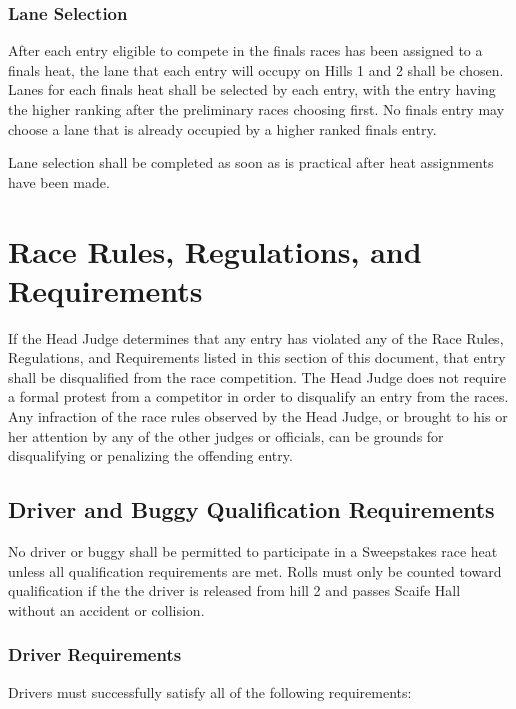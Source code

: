 \subsubsection{Lane Selection}

	After each entry eligible to compete in the finals races has been assigned to a finals heat, the lane that each entry will occupy on Hills 1 and 2 shall be chosen. Lanes for each finals heat shall be selected by each entry, with the entry having the higher ranking after the preliminary races choosing first. No finals entry may choose a lane that is already occupied by a higher ranked finals entry.

	Lane selection shall be completed as soon as is practical after heat assignments have been made.

\section{Race Rules, Regulations, and Requirements}

	If the Head Judge determines that any entry has violated any of the Race Rules, Regulations, and Requirements listed in this section of this document, that entry shall be disqualified from the race competition. The Head Judge does not require a formal protest from a competitor in order to disqualify an entry from the races. Any infraction of the race rules observed by the Head Judge, or brought to his or her attention by any of the other judges or officials, can be grounds for disqualifying or penalizing the offending entry.

\subsection{Driver and Buggy Qualification Requirements}
	No driver or buggy shall be permitted to participate in a Sweepstakes race heat unless all qualification requirements are met. Rolls must only be counted toward qualification if the the driver is released from hill 2 and passes Scaife Hall
\label{sec:DriverAndBuggyQualificationRequirements}
	without an accident or collision.

\subsubsection{Driver Requirements}
Drivers must successfully satisfy all of the following requirements:

